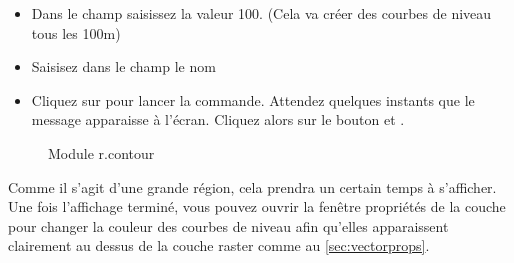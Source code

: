 {\begin{itemize}[label=--]
\item Dans le champ  saisissez la valeur 100. (Cela va créer des courbes de niveau tous les 100m)
\item Saisisez dans le champ  le nom 
\item Cliquez sur  pour lancer la commande. Attendez quelques instants que le message  apparaisse à l'écran. Cliquez alors sur le bouton  et .
\end{itemize}

\begin{figure}[ht]
\centering
    \hspace{0.5cm}
   \caption{Module \grass r.contour \nixcaption}\label{fig:grass_toolbox_rcontour}
\end{figure}

Comme il s'agit d'une grande région, cela prendra un certain temps à s'afficher. 
Une fois l'affichage terminé, vous pouvez ouvrir la fenêtre propriétés de la couche pour changer la couleur des courbes de niveau afin qu'elles apparaissent clairement au dessus de la couche raster comme au \ref{sec:vectorprops}.

}
